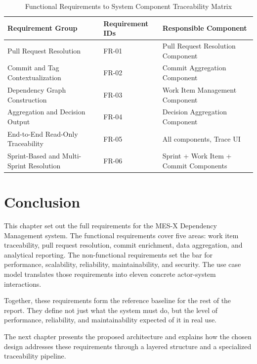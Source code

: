 \begin{table}[H]
  \centering
  \caption{Functional Requirements to System Component Traceability Matrix}
  \label{tab:req-traceability}
  \begin{tabular}{|p{4.5cm}|p{3cm}|p{5.5cm}|}
    \hline
    \textbf{Requirement Group} & \textbf{Requirement IDs} & \textbf{Responsible Component} \\
    \hline
    Pull Request Resolution & FR-01 & Pull Request Resolution Component \\
    \hline
    Commit and Tag Contextualization & FR-02 & Commit Aggregation Component \\
    \hline
    Dependency Graph Construction & FR-03 & Work Item Management Component \\
    \hline
    Aggregation and Decision Output & FR-04 & Decision Aggregation Component \\
    \hline
    End-to-End Read-Only Traceability & FR-05 & All components, Trace UI \\
    \hline
    Sprint-Based and Multi-Sprint Resolution & FR-06 & Sprint + Work Item + Commit Components \\
    \hline
  \end{tabular}
\end{table}

% 
\section{Conclusion}
\label{sec:req-conclusion}

This chapter set out the full requirements for the MES-X Dependency Management
system. The functional requirements cover five areas: work item traceability,
pull request resolution, commit enrichment, data aggregation, and analytical
reporting. The non-functional requirements set the bar for performance,
scalability, reliability, maintainability, and security. The use case model
translates those requirements into eleven concrete actor-system interactions.

Together, these requirements form the reference baseline for the rest of the
report. They define not just what the system must do, but the level of
performance, reliability, and maintainability expected of it in real use.

The next chapter presents the proposed architecture and explains how the chosen
design addresses these requirements through a layered structure and a
specialized traceability pipeline.